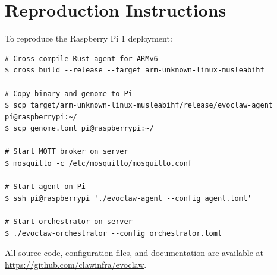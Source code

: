 \documentclass{article}
\begin{document}
\section{Reproduction Instructions}
\label{app:reproduction}

To reproduce the Raspberry Pi 1 deployment:

\begin{lstlisting}[style=tomlcode, caption={Build and deploy commands.}, label={lst:deploy}]
# Cross-compile Rust agent for ARMv6
$ cross build --release --target arm-unknown-linux-musleabihf

# Copy binary and genome to Pi
$ scp target/arm-unknown-linux-musleabihf/release/evoclaw-agent pi@raspberrypi:~/
$ scp genome.toml pi@raspberrypi:~/

# Start MQTT broker on server
$ mosquitto -c /etc/mosquitto/mosquitto.conf

# Start agent on Pi
$ ssh pi@raspberrypi './evoclaw-agent --config agent.toml'

# Start orchestrator on server
$ ./evoclaw-orchestrator --config orchestrator.toml
\end{lstlisting}

All source code, configuration files, and documentation are available at \url{https://github.com/clawinfra/evoclaw}.
\end{document}
